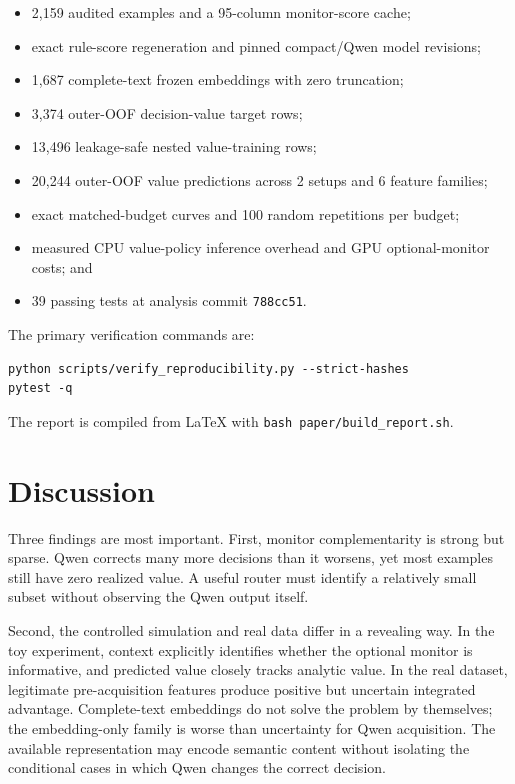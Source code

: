 \documentclass[11pt,a4paper]{article}
\newcommand{\code}[1]{\texttt{#1}}
\begin{document}
\begin{itemize}
  \item 2,159 audited examples and a 95-column monitor-score cache;
  \item exact rule-score regeneration and pinned compact/Qwen model revisions;
  \item 1,687 complete-text frozen embeddings with zero truncation;
  \item 3,374 outer-OOF decision-value target rows;
  \item 13,496 leakage-safe nested value-training rows;
  \item 20,244 outer-OOF value predictions across 2 setups and 6 feature families;
  \item exact matched-budget curves and 100 random repetitions per budget;
  \item measured CPU value-policy inference overhead and GPU optional-monitor costs; and
  \item 39 passing tests at analysis commit \code{788cc51}.
\end{itemize}

The primary verification commands are:
\begin{verbatim}
python scripts/verify_reproducibility.py --strict-hashes
pytest -q
\end{verbatim}
The report is compiled from LaTeX with \code{bash paper/build\_report.sh}.

\section{Discussion}

Three findings are most important. First, monitor complementarity is strong but sparse. Qwen corrects many more decisions than it worsens, yet most examples still have zero realized value. A useful router must identify a relatively small subset without observing the Qwen output itself.

Second, the controlled simulation and real data differ in a revealing way. In the toy experiment, context explicitly identifies whether the optional monitor is informative, and predicted value closely tracks analytic value. In the real dataset, legitimate pre-acquisition features produce positive but uncertain integrated advantage. Complete-text embeddings do not solve the problem by themselves; the embedding-only family is worse than uncertainty for Qwen acquisition. The available representation may encode semantic content without isolating the conditional cases in which Qwen changes the correct decision.
\end{document}
